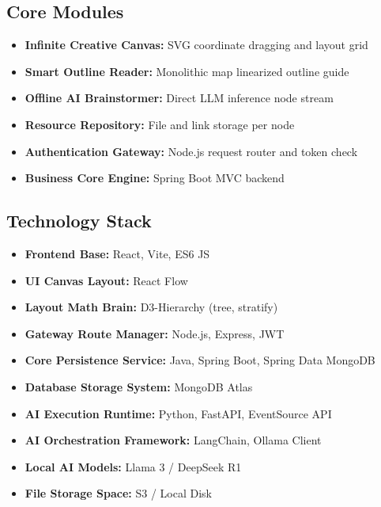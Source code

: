 \documentclass[12pt, a4paper]{article}
\begin{document}
\subsection{Core Modules}
\begin{itemize}[label=\small$\bullet$, leftmargin=15pt, nosep]
  \item \textbf{Infinite Creative Canvas:} SVG coordinate dragging and layout grid
  \item \textbf{Smart Outline Reader:} Monolithic map linearized outline guide
  \item \textbf{Offline AI Brainstormer:} Direct LLM inference node stream
  \item \textbf{Resource Repository:} File and link storage per node
  \item \textbf{Authentication Gateway:} Node.js request router and token check
  \item \textbf{Business Core Engine:} Spring Boot MVC backend
\end{itemize}

\subsection{Technology Stack}
\begin{itemize}[label=\small$\bullet$, leftmargin=15pt, nosep]
  \item \textbf{Frontend Base:} React, Vite, ES6 JS
  \item \textbf{UI Canvas Layout:} React Flow
  \item \textbf{Layout Math Brain:} D3-Hierarchy (tree, stratify)
  \item \textbf{Gateway Route Manager:} Node.js, Express, JWT
  \item \textbf{Core Persistence Service:} Java, Spring Boot, Spring Data MongoDB
  \item \textbf{Database Storage System:} MongoDB Atlas
  \item \textbf{AI Execution Runtime:} Python, FastAPI, EventSource API
  \item \textbf{AI Orchestration Framework:} LangChain, Ollama Client
  \item \textbf{Local AI Models:} Llama 3 / DeepSeek R1
  \item \textbf{File Storage Space:} S3 / Local Disk
\end{itemize}
\end{document}
